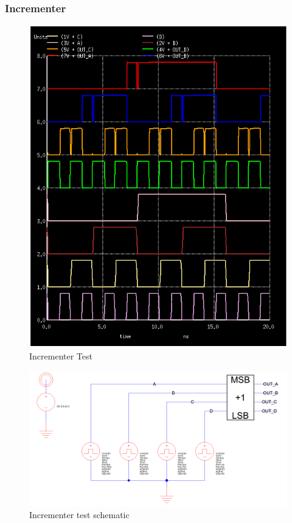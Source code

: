 \documentclass[12pt]{report}
\begin{document}
\subsubsection*{Incrementer}
\begin{figure}[H]
  \centering
    \includegraphics[width=1.0\textwidth]{incrementer_test.PNG}
  \caption{Incrementer Test}
  \label{fig:incrementer_test}
\end{figure}
\begin{figure}[H]
  \centering
    \includegraphics[width=1.0\textwidth]{TestSchematics/incrementer.PNG}
  \caption{Incrementer test schematic}
\end{figure}
\end{document}
